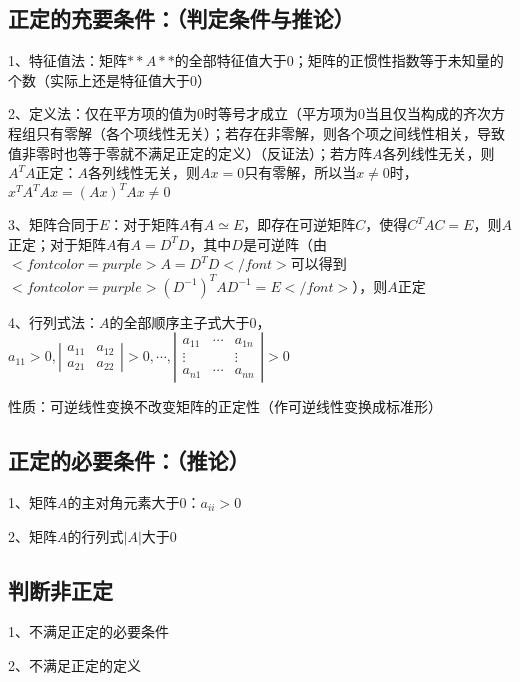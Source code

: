 \subsection{正定的充要条件：（判定条件与推论）}

1、特征值法：矩阵$ **A** $的全部特征值大于0；矩阵的正惯性指数等于未知量的个数（实际上还是特征值大于0）

2、定义法：仅在平方项的值为0时等号才成立（平方项为0当且仅当构成的齐次方程组只有零解（各个项线性无关）；若存在非零解，则各个项之间线性相关，导致值非零时也等于零就不满足正定的定义）（反证法）；若方阵$ A $各列线性无关，则$ A^TA $正定：$ A $各列线性无关，则$ Ax=0 $只有零解，所以当$ x\ne 0 $时，$ x^TA^TAx = (Ax)^TAx \ne 0 $

3、矩阵合同于$ E $：对于矩阵$ A $有$ A \simeq E $，即存在可逆矩阵$ C $，使得$ C^TAC=E $，则$ A $正定；对于矩阵$ A $有$ A=D^TD $，其中$ D $是可逆阵（由$ <font color=purple>A=D^TD</font> $可以得到$ <font color=purple>(D^{-1})^TAD^{-1}=E</font> $），则$ A $正定

4、行列式法：$ A $的全部顺序主子式大于0，$ a_{11}>0,\left|\begin{array}{ll}a_{11} & a_{12} \\a_{21} & a_{22}\end{array}\right|>0, \cdots,\left|\begin{array}{ccc}a_{11} & \cdots & a_{1 n} \\\vdots & & \vdots \\a_{n 1} & \cdots & a_{n n}\end{array}\right|>0 $

性质：可逆线性变换不改变矩阵的正定性（作可逆线性变换成标准形）



\subsection{正定的必要条件：（推论）}

1、矩阵$ A $的主对角元素大于0：$ a_{ii} > 0 $

2、矩阵$ A $的行列式$ |A| $大于0



\subsection{判断非正定}

1、不满足正定的必要条件

2、不满足正定的定义

